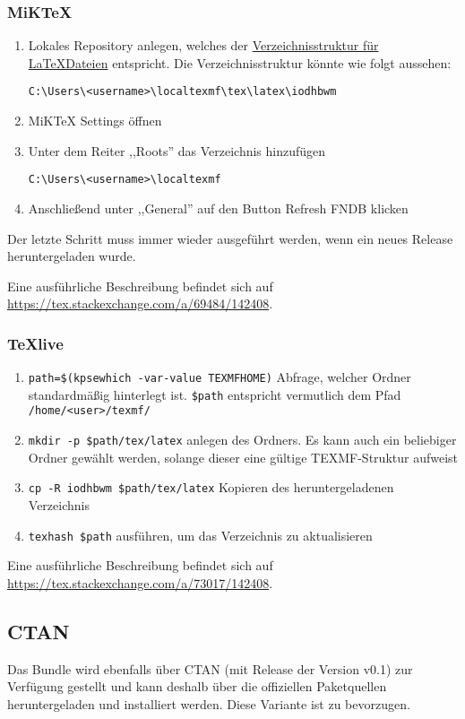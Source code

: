 \documentclass[babel=ngerman,highlight=false]{skdoc}
\begin{document}
            \subsubsection{MiKTeX}
                \begin{enumerate}
                    \item Lokales Repository anlegen, welches der \href{http://tug.ctan.org/tds/tds.html}{Verzeichnisstruktur für \LaTeX Dateien} entspricht. Die Verzeichnisstruktur könnte wie folgt aussehen:\par \verb|C:\Users\<username>\localtexmf\tex\latex\iodhbwm|
                    \item MiKTeX Settings öffnen
                    \item Unter dem Reiter ,,Roots'' das Verzeichnis hinzufügen\par \verb|C:\Users\<username>\localtexmf|
                    \item Anschließend unter ,,General'' auf den Button Refresh FNDB klicken
                \end{enumerate}

                Der letzte Schritt muss immer wieder ausgeführt werden, wenn ein neues Release heruntergeladen wurde.

                Eine ausführliche Beschreibung befindet sich auf \url{https://tex.stackexchange.com/a/69484/142408}.

            \subsubsection{TeXlive}

                \begin{enumerate}
                    \item \verb|path=$(kpsewhich -var-value TEXMFHOME)| Abfrage, welcher Ordner standardmäßig hinterlegt ist. \verb|$path| entspricht vermutlich dem Pfad\\ \verb|/home/<user>/texmf/|
                    \item \verb|mkdir -p $path/tex/latex| anlegen des Ordners. Es kann auch ein beliebiger Ordner gewählt werden, solange dieser eine gültige TEXMF-Struktur aufweist
                    \item \verb|cp -R iodhbwm $path/tex/latex| Kopieren des heruntergeladenen Verzeichnis
                    \item \verb|texhash $path| ausführen, um das Verzeichnis zu aktualisieren
                \end{enumerate}

                Eine ausführliche Beschreibung befindet sich auf \url{https://tex.stackexchange.com/a/73017/142408}.

        \subsection{CTAN}
            Das Bundle wird ebenfalls über CTAN (mit Release der Version v0.1) zur Verfügung gestellt und kann deshalb über die offiziellen Paketquellen heruntergeladen und installiert werden. Diese Variante ist zu bevorzugen.

    \PrintIndex
\end{document}
